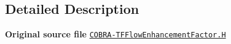 \subsection{Detailed Description}
{\bfseries Original source file} \href{../../../home/carlo/data/GeN-Foam/GeN-Foam_ffn/GeN-Foam/GeN-Foam/classes/thermalHydraulics/src/physicsModels/heatTransferModels/FSHeatTransferCoefficientModels/subModels/flowEnhancementFactorModels/COBRA-TF/COBRA-TFFlowEnhancementFactor.H}{\tt C\+O\+B\+R\+A-\/\+T\+F\+Flow\+Enhancement\+Factor.\+H} 